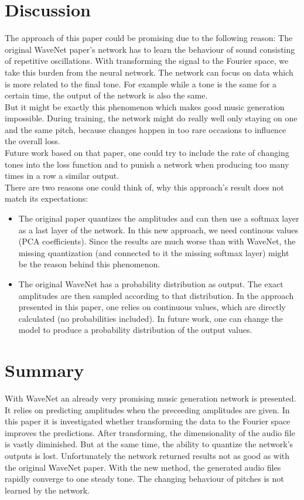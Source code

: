 \documentclass[10pt,conference,compsocconf]{IEEEtran}
\begin{document}
\section{Discussion}
The approach of this paper could be promising due to the following reason: The original WaveNet paper's network has to learn the behaviour of sound consisting of repetitive oscillations. With transforming the signal to the Fourier space, we take this burden from the neural network. The network can focus on data which is more related to the final tone. For example while a tone is the same for a certain time, the output of the network is also the same.\\
But it might be exactly this phenomenon which makes good music generation impossible. During training, the network might do really well only staying on one and the same pitch, because changes happen in too rare occasions to influence the overall loss.\\
Future work based on that paper, one could try to include the rate of changing tones into the loss function and to punish a network when producing too many times in a row a similar output.\\
There are two reasons one could think of, why this approach's result does not match its expectations:
\begin{itemize}
  \item The original paper quantizes the amplitudes and can then use a softmax layer as a last layer of the network. In this new approach, we need continous values (PCA coefficients). Since the results are much worse than with WaveNet, the missing quantization (and connected to it the missing softmax layer) might be the reason behind this phenomenon.
  \item The original WaveNet has a probability distribution as output. The exact amplitudes are then sampled according to that distribution. In the approach presented in this paper, one relies on continuous values, which are directly calculated (no probabilities included). In future work, one can change the model to produce a probability distribution of the output values.
\end{itemize}

\section{Summary}
With WaveNet an already very promising music generation network is presented. It relies on predicting amplitudes when the preceeding amplitudes are given. In this paper it is investigated whether transforming the data to the Fourier space improves the predictions. After transforming, the dimensionality of the audio file is vastly diminished. But at the same time, the ability to quantize the network's outputs is lost. Unfortunately the network returned results not as good as with the original WaveNet paper. With the new method, the generated audio files rapidly converge to one steady tone. The changing behaviour of pitches is not learned by the network.



\end{document}
